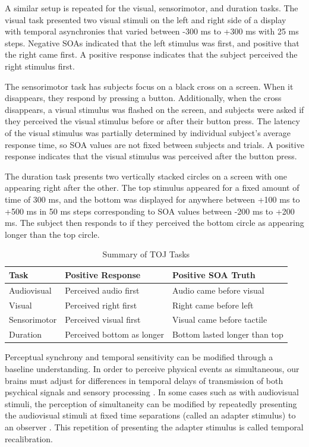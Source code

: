 \documentclass[11pt, oneside, openany]{scrbook}
\begin{document}
A similar setup is repeated for the visual, sensorimotor, and duration tasks. The visual task presented two visual stimuli on the left and right side of a display with temporal asynchronies that varied between -300 ms to +300 ms with 25 ms steps. Negative SOAs indicated that the left stimulus was first, and positive that the right came first. A positive response indicates that the subject perceived the right stimulus first.

The sensorimotor task has subjects focus on a black cross on a screen. When it disappears, they respond by pressing a button. Additionally, when the cross disappears, a visual stimulus was flashed on the screen, and subjects were asked if they perceived the visual stimulus before or after their button press. The latency of the visual stimulus was partially determined by individual subject's average response time, so SOA values are not fixed between subjects and trials. A positive response indicates that the visual stimulus was perceived after the button press.

The duration task presents two vertically stacked circles on a screen with one appearing right after the other. The top stimulus appeared for a fixed amount of time of 300 ms, and the bottom was displayed for anywhere between +100 ms to +500 ms in 50 ms steps corresponding to SOA values between -200 ms to +200 ms. The subject then responds to if they perceived the bottom circle as appearing longer than the top circle.

\begin{table}[!h]

\caption{\label{tab:ch020-toj-summary}Summary of TOJ Tasks}
\centering
\begin{tabular}[t]{lll}
\toprule
Task & Positive Response & Positive SOA Truth\\
\midrule
Audiovisual & Perceived audio first & Audio came before visual\\
Visual & Perceived right first & Right came before left\\
Sensorimotor & Perceived visual first & Visual came before tactile\\
Duration & Perceived bottom as longer & Bottom lasted longer than top\\
\bottomrule
\end{tabular}
\end{table}

Perceptual synchrony and temporal sensitivity can be modified through a baseline understanding. In order to perceive physical events as simultaneous, our brains must adjust for differences in temporal delays of transmission of both psychical signals and sensory processing \citep{fujisaki2004recalibration}. In some cases such as with audiovisual stimuli, the perception of simultaneity can be modified by repeatedly presenting the audiovisual stimuli at fixed time separations (called an adapter stimulus) to an observer \citep{vroomen2004recalibration}. This repetition of presenting the adapter stimulus is called temporal recalibration.
\end{document}

